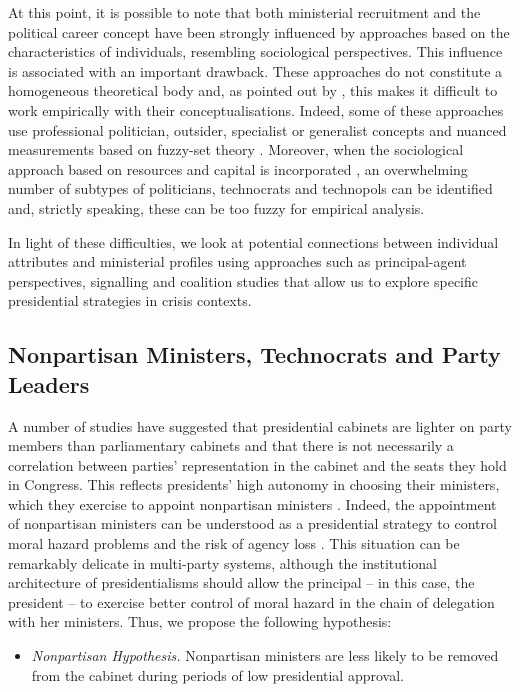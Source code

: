 \documentclass[12pt,halfline,a4paper]{ouparticle}
\begin{document}
At this point, it is possible to note that both ministerial recruitment and the political career concept have been strongly influenced by approaches based on the characteristics of individuals, resembling sociological perspectives. This influence is associated with an important drawback. These approaches do not constitute a homogeneous theoretical body and, as pointed out by \cite{Camerlo2018}, this makes it difficult to work empirically with their conceptualisations. Indeed, some of these approaches use professional politician, outsider, specialist or generalist concepts and nuanced measurements based on fuzzy-set theory \citep{Camerlo2015b}. Moreover, when the sociological approach based on resources and capital is incorporated \citep{Joignant2011, Joignant2012}, an overwhelming number of subtypes of politicians, technocrats and technopols can be identified and, strictly speaking, these can be too fuzzy for empirical analysis. 

In light of these difficulties, we look at potential connections between individual attributes and ministerial profiles using approaches such as principal-agent perspectives, signalling and coalition studies that allow us to explore specific presidential strategies in crisis contexts.

\subsection{Nonpartisan Ministers, Technocrats and Party Leaders}
\label{sec2.2}

A number of studies have suggested that presidential cabinets are lighter on party members than parliamentary cabinets and that there is not necessarily a correlation between parties’ representation in the cabinet and the seats they hold in Congress. This reflects presidents’ high autonomy in choosing their ministers, which they exercise to appoint nonpartisan ministers \citep{Altman2000, Altman2008}. Indeed, the appointment of nonpartisan ministers can be understood as a presidential strategy to control moral hazard problems and the risk of agency loss \citep{Chaisty2018, MartinezGallardo2015}. This situation can be remarkably delicate in multi-party systems, although the institutional architecture of presidentialisms should allow the principal -- in this case, the president -- to exercise better control of moral hazard in the chain of delegation with her ministers. Thus, we propose the following hypothesis:

\begin{itemize}
\item{{\itshape Nonpartisan Hypothesis.} Nonpartisan ministers are less likely to be removed from the cabinet during periods of low presidential approval.}
\end{itemize}
\end{document}
